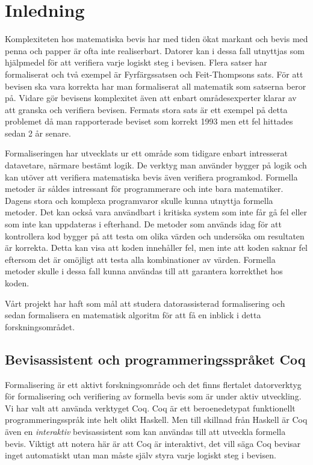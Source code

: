 \section{Inledning}
Komplexiteten hos matematiska bevis har med tiden ökat markant och bevis med
penna och papper är ofta inte realiserbart. Datorer kan i dessa fall utnyttjas
som hjälpmedel för att verifiera varje logiskt steg i bevisen. Flera satser har
formaliserat och två exempel är Fyrfärgssatsen\cite{gonthier2008formal} och
Feit-Thompsons sats\cite{something}. För att bevisen ska vara korrekta har man
formaliserat all matematik som satserna beror på. Vidare gör bevisens
komplexitet även att enbart områdesexperter klarar av att granska och verifiera
bevisen. Fermats stora sats är ett exempel på detta problemet då man
rapporterade beviset som korrekt 1993 men ett fel hittades sedan 2 år
senare\cite{something}.

Formaliseringen har utvecklats ur ett område som tidigare enbart intresserat
datavetare, närmare bestämt logik. De verktyg man använder bygger på logik och
kan utöver att verifiera matematiska bevis även verifiera programkod. Formella
metoder är såldes intressant för programmerare och inte bara matematiker.
Dagens stora och komplexa programvaror skulle kunna utnyttja formella metoder.
Det kan också vara användbart i kritiska system som inte får gå fel eller som
inte kan uppdateras i efterhand. De metoder som används idag för att
kontrollera kod bygger på att testa om olika värden och undersöka om resultaten
är korrekta. Detta kan visa att koden innehåller fel, men inte att koden saknar
fel eftersom det är omöjligt att testa alla kombinationer av värden. Formella
metoder skulle i dessa fall kunna användas till att garantera korrekthet hos
koden.

Vårt projekt har haft som mål att studera datorassisterad formalisering och
sedan formalisera en matematisk algoritm för att få en inblick i detta
forskningsområdet.

\subsection{Bevisassistent och programmeringsspråket Coq}
Formalisering är ett aktivt forskningsområde och det finns flertalet
datorverktyg för formalisering och verifiering av formella bevis som är under
aktiv utveckling. Vi har valt att använda verktyget Coq. Coq är ett
beroenedetypat funktionellt programmeringsspråk inte helt olikt Haskell. Men
till skillnad från Haskell är Coq även en \emph{interaktiv} bevisassistent som
kan användas till att utveckla formella bevis. Viktigt att notera här är att
Coq är interaktivt, det vill säga Coq bevisar inget automatiskt utan man måste
själv styra varje logiskt steg i bevisen.

